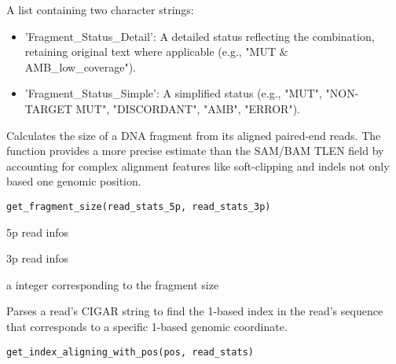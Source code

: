\documentclass[a4paper]{book}
\begin{document}
%
\begin{Value}
A list containing two character strings:
\begin{itemize}

\item{} 'Fragment\_Status\_Detail': A detailed status reflecting the combination,
retaining original text where applicable (e.g., "MUT \& AMB\_low\_coverage").
\item{} 'Fragment\_Status\_Simple': A simplified status (e.g., "MUT", "NON-TARGET MUT",
"DISCORDANT", "AMB", "ERROR").

\end{itemize}

\end{Value}
%
\begin{Description}
Calculates the size of a DNA fragment from its aligned paired-end reads. The function provides a more precise
estimate than the SAM/BAM TLEN field by accounting for complex alignment features like soft-clipping and indels not
only based one genomic position.
\end{Description}
%
\begin{Usage}
\begin{verbatim}
get_fragment_size(read_stats_5p, read_stats_3p)
\end{verbatim}
\end{Usage}
%
\begin{Arguments}
\begin{ldescription}
\item[\code{read\_stats\_5p}] 5p read infos

\item[\code{read\_stats\_3p}] 3p read infos
\end{ldescription}
\end{Arguments}
%
\begin{Value}
a integer corresponding to the fragment size
\end{Value}
%
\begin{Description}
Parses a read's CIGAR string to find the 1-based index in the read's sequence that corresponds to a
specific 1-based genomic coordinate.
\end{Description}
%
\begin{Usage}
\begin{verbatim}
get_index_aligning_with_pos(pos, read_stats)
\end{verbatim}
\end{Usage}
\end{document}
